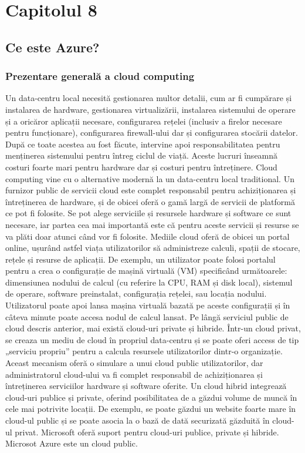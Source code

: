 \chapter{Capitolul 8}
\section{Ce este Azure?}
\subsection{Prezentare generală a cloud computing}
Un data-centru local necesită gestionarea multor detalii, cum ar fi cumpărare și instalarea de hardware, gestionarea virtualizării, instalarea sistemului de operare și  a oricăror aplicații necesare, configurarea rețelei (inclusiv a firelor necesare pentru funcționare), configurarea firewall-ului dar și configurarea stocării datelor. După ce toate acestea au fost făcute, intervine apoi responsabilitatea pentru menținerea sistemului pentru întreg ciclul de viață. Aceste lucruri înseamnă costuri foarte mari pentru hardware dar și costuri pentru întreținere.\newline
Cloud computing vine cu o alternative modernă la un data-centru local traditional. Un furnizor public de servicii cloud este complet responsabil pentru achiziționarea și întreținerea de hardware, și de obicei oferă o gamă largă de servicii de platformă ce pot fi folosite. Se pot alege serviciile și resursele hardware și software ce sunt necesare, iar partea cea mai importantă este că pentru aceste servicii și resurse se va plăti doar atunci când vor fi folosite.\newline
Mediile cloud oferă de obicei un portal online, ușurând astfel viața utilizatorilor să administreze calculi, spații de stocare, rețele și resurse de aplicații. De exemplu, un utilizator poate folosi portalul pentru a crea o configurație de mașină virtuală (VM) specificând următoarele: dimensiunea nodului de calcul (cu referire la CPU, RAM și disk local), sistemul de operare, software preinstalat, configurația rețelei, sau locația nodului. Utilizatorul poate apoi lansa mașina virtuală bazată pe aceste configurații și în câteva minute poate accesa nodul de calcul lansat. \newline
Pe lângă serviciul public de cloud descris anterior, mai există cloud-uri private și hibride. Într-un cloud privat, se creaza un mediu de cloud în propriul data-centru și se poate oferi access de tip „serviciu propriu” pentru a calcula resursele utilizatorilor dintr-o organizație. Aceast mecanism oferă o simulare a unui cloud public utilizatorilor, dar administratorul cloud-ului va fi complet responsabil de achiziționarea și întreținerea serviciilor hardware și software oferite. Un cloud hibrid integrează cloud-uri publice și private, oferind  posibilitatea de a găzdui volume de muncă în cele mai potrivite locații. De exemplu, se poate găzdui un website foarte mare în cloud-ul public și se poate asocia la o bază de dată securizată găzduită în cloud-ul privat.\newline
Microsoft oferă suport pentru cloud-uri publice, private și hibride. Microsot Azure este un cloud public.\newline

